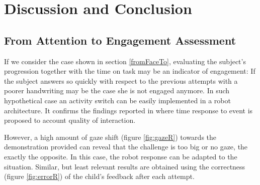 \documentclass{sig-alternate}
\begin{document}
\section{Discussion and Conclusion}
\subsection{From Attention to Engagement Assessment}

If we consider the case shown in section \ref{fromFaceTo}, evaluating the
subject's progression together with the time on task may be an indicator of
engagement: If the subject answers so quickly with respect to the previous
attempts with a poorer handwriting may be the case she is not engaged anymore.
In such hypothetical case an activity switch can be easily implemented in a
robot architecture. It confirms the findings reported in \cite{anzalone} where
time response to event is proposed to account quality of interaction. 

However, a high amount of gaze shift (figure \ref{fig:gazeR}) towards the
demonstration provided can reveal that the challenge is too big or no gaze, the
exactly the opposite. In this case, the robot response can be adapted to the
situation. Similar, but least relevant results are obtained using the
correctness (figure \ref{fig:errorR}) of the child's feedback after each
attempt. 
\end{document}

